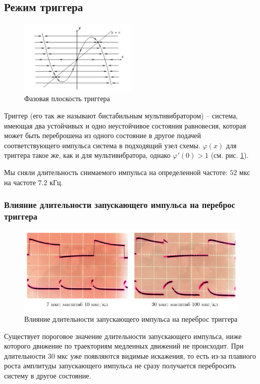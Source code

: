 \documentclass[a4paper,14pt]{extarticle}
\begin{document}
\subsection{Режим триггера}
\begin{figure}[H]
	\centering
	\includegraphics[width=0.5\textwidth]{photo/trigger}
	\caption{Фазовая плоскость триггера}
	\label{fig:tr}
\end{figure}
Триггер (его так же называют бистабильным мультивибратором) -- система, имеющая два устойчивых и одно неустойчивое состояния равновесия, которая может быть переброшена из одного состояние в другое подачей соответствующего импульса система в подходящий узел схемы. 
$\varphi(x)$ для триггера такое же, как и для мультивибратора, однако $\varphi'(0)>1$ (см. рис. \ref{fig:tr}).

Мы сняли длительность снимаемого импульса на определенной частоте: $52$ мкс на частоте $7.2$ кГц.

\subsubsection{Влияние длительности запускающего импульса на переброс триггера}
   \begin{figure}[H]
    \centering
       \includegraphics[width=1\textwidth]{plot/ris2}
       \vspace{-1.4em}
     \caption{Влияние длительности запускающего импульса на переброс триггера}
     \label{fig:dummy}
	\end{figure}

Существует пороговое значение длительности запускающего импульса, ниже которого движение по траекториям медленных движений не происходит. При длительности 30 мкс уже появляются видимые искажения, то есть из-за плавного роста амплитуды запускающего импульса не сразу получается перебросить систему в другое состояние.
\end{document}
